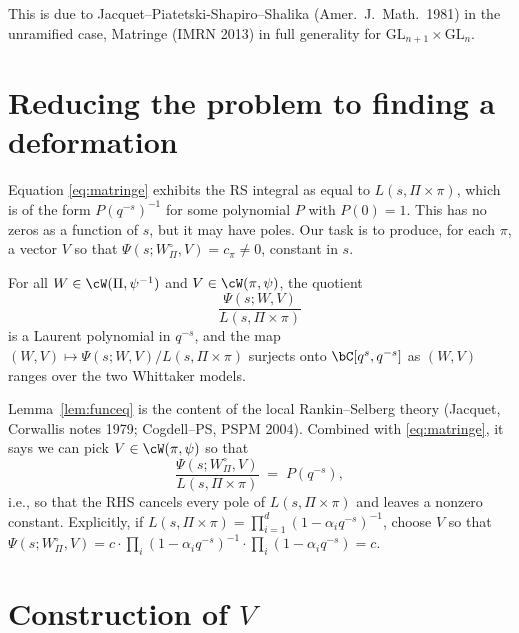 This is due to Jacquet--Piatetski-Shapiro--Shalika (Amer.\ J.\ Math.\ 1981) in the unramified case, Matringe (IMRN 2013) in full generality for $\mathrm{GL}_{n+1}\times\mathrm{GL}_n$.

\section{Reducing the problem to finding a deformation}

Equation \eqref{eq:matringe} exhibits the RS integral as equal to $L(s,\Pi\times\pi)$, which is of the form $P(q^{-s})^{-1}$ for some polynomial $P$ with $P(0)=1$. This has no zeros as a function of $s$, but it may have poles. Our task is to produce, for each $\pi$, a vector $V$ so that $\Psi(s;W^\circ_\Pi, V) = c_\pi \neq 0$, constant in $s$.

\begin{lemma}\label{lem:funceq}
For all $W\in\cW(\Pi,\psi^{-1})$ and $V\in\cW(\pi,\psi)$, the quotient
\[
   \frac{\Psi(s;W,V)}{L(s,\Pi\times\pi)}
\]
is a Laurent polynomial in $q^{-s}$, and the map $(W,V)\mapsto \Psi(s;W,V)/L(s,\Pi\times\pi)$ surjects onto $\bC[q^{s},q^{-s}]$ as $(W,V)$ ranges over the two Whittaker models.
\end{lemma}

Lemma~\ref{lem:funceq} is the content of the local Rankin--Selberg theory (Jacquet, Corwallis notes 1979; Cogdell--PS, PSPM 2004). Combined with \eqref{eq:matringe}, it says we can pick $V\in\cW(\pi,\psi)$ so that
\begin{equation}\label{eq:poleclear}
   \frac{\Psi(s;W^\circ_\Pi,V)}{L(s,\Pi\times\pi)} \;=\; P(q^{-s}),
\end{equation}
i.e., so that the RHS cancels every pole of $L(s,\Pi\times\pi)$ and leaves a nonzero constant. Explicitly, if $L(s,\Pi\times\pi)=\prod_{i=1}^d (1-\alpha_i q^{-s})^{-1}$, choose $V$ so that $\Psi(s;W^\circ_\Pi,V) = c\cdot \prod_i (1-\alpha_i q^{-s})^{-1}\cdot \prod_i (1-\alpha_i q^{-s}) = c$.

\section{Construction of $V$}

